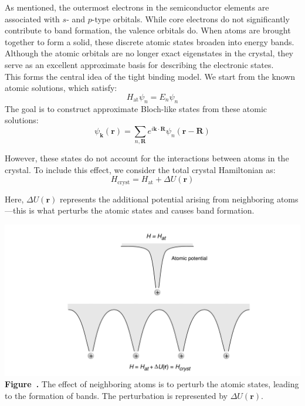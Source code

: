 As mentioned, the outermost electrons in the semiconductor elements are associated with $s$- and $p$-type orbitals. While core electrons do not significantly contribute to band formation, the valence orbitals do. When atoms are brought together to form a solid, these discrete atomic states broaden into energy bands. Although the atomic orbitals are no longer exact eigenstates in the crystal, they serve as an excellent approximate basis for describing the electronic states.\\
This forms the central idea of the tight binding model. We start from the known atomic solutions, which satisfy:
\begin{equation*}
	H_\text{at} \psi_n = E_n \psi_n
\end{equation*}
The goal is to construct approximate Bloch-like states from these atomic solutions:
\begin{equation*}
	\psi_{\mathbf{k}}(\mathbf{r}) = \sum_{n,\mathbf{R}} e^{i\mathbf{k} \cdot \mathbf{R}} \psi_n(\mathbf{r} - \mathbf{R})
\end{equation*}

However, these states do not account for the interactions between atoms in the crystal. To include this effect, we consider the total crystal Hamiltonian as:
\begin{equation*}
	H_\text{cryst} = H_\text{at} + \Delta U(\mathbf{r})
\end{equation*}

Here, \( \Delta U(\mathbf{r}) \) represents the additional potential arising from neighboring atoms—this is what perturbs the atomic states and causes band formation.
\begin{center}
	\begin{minipage}{0.9\textwidth}
		\centering
		\includegraphics[width=\textwidth]{img/neighboring_atoms.png}
		\\[0.5em]
		\textbf{Figure~\thefigure.} The effect of neighboring atoms is to perturb the atomic states, leading to the formation of bands. The perturbation is represented by \( \Delta U(\mathbf{r}) \).
		\label{fig:neighboring_atoms}
	\end{minipage}
\end{center}

